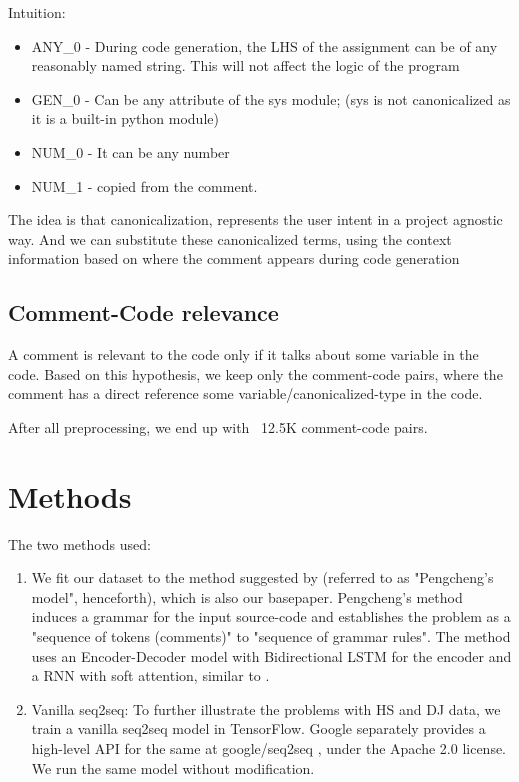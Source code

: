 \documentclass{IEEEtran}
\begin{document}
    Intuition:
    \begin{itemize}
      \item 
      ANY\_0 - During code generation, the LHS of the assignment can be
              of any reasonably named string. This will not affect the 
              logic of the program                                    
      \item
      GEN\_0 - Can be any attribute of the sys module; (sys is not    
              canonicalized as it is a built-in python module)      
      \item
      NUM\_0 - It can be any number                                 
      \item
      NUM\_1 - copied from the comment.                            
      \end{itemize}
      The idea is that canonicalization, represents the user intent
      in a project agnostic way. And we can substitute these      
      canonicalized terms, using the context information based on
      where the comment appears during code generation       

    \subsection{Comment-Code relevance}
      A comment is relevant to the code only if it talks about some
      variable in the code. Based on this hypothesis, we keep only the
      comment-code pairs, where the comment has a direct reference   
      some variable/canonicalized-type in the code.

      After all preprocessing, we end up with ~12.5K comment-code pairs.
    \section{Methods}

    The two methods used:

    \begin{enumerate}
        \item 
          We fit our dataset to the method suggested by \cite{yinsyntactic} (referred to as
          "Pengcheng's model", henceforth), which is also our basepaper. Pengcheng's method
          induces a grammar for the input source-code and establishes the problem as a
          "sequence of tokens (comments)" to "sequence of grammar rules". The method uses
          an Encoder-Decoder model with Bidirectional LSTM for the encoder and a RNN with
          soft attention, similar to \cite{bahdanau2014neural}. 

        \item Vanilla seq2seq: To further illustrate the problems with HS and DJ data, we train a 
          vanilla seq2seq model in TensorFlow. Google separately provides a high-level API for 
          the same at google/seq2seq \cite{britz2017}, under the Apache 2.0 license. 
          We run the same model without modification. 
    \end{enumerate}
\end{document}

